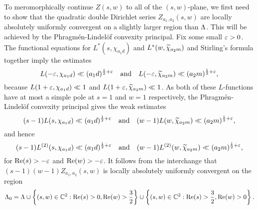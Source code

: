      To meromorphically continue $Z(s,w)$ to all of the $(s,w)$-plane, we first need to show that the quadratic double Dirichlet series $Z_{a_{1},a_{2}}(s,w)$ are locally absolutely uniformly convergent on a slightly larger region than $\Lambda$. This will be achieved by the Phragm\'en-Lindel\"of convexity principal. Fix some small $\varepsilon > 0$. The functional equations for $L^{\ast}(s,\chi_{a_{1}d})$ and $L^{\ast}(w,\widetilde{\chi}_{a_{2}m})$ and Stirling's formula together imply the estimates
    \[
        L(-\varepsilon,\chi_{a_{1}d}) \ll (a_{1}d)^{\frac{1}{2}+\varepsilon} \quad \text{and} \quad L(-\varepsilon,\widetilde{\chi}_{a_{2}m}) \ll (a_{2}m)^{\frac{1}{2}+\varepsilon},
    \]
    because $L(1+\varepsilon,\chi_{a_{1}d}) \ll 1$ and $L(1+\varepsilon,\widetilde{\chi}_{a_{2}m}) \ll 1$. As both of these $L$-functions have at most a simple pole at $s = 1$ and $w = 1$ respectively, the Phragm\'en-Lindel\"of convexity principal gives the weak estimates
    \[
        (s-1)L(s,\chi_{a_{1}d}) \ll (a_{1}d)^{\frac{1}{2}+\varepsilon} \quad \text{and} \quad (w-1)L(w,\widetilde{\chi}_{a_{2}m}) \ll (a_{2}m)^{\frac{1}{2}+\varepsilon},
    \]
    and hence
    \[
        (s-1)L^{(2)}(s,\chi_{a_{1}d}) \ll (a_{1}d)^{\frac{1}{2}+\varepsilon} \quad \text{and} \quad (w-1)L^{(2)}(w,\widetilde{\chi}_{a_{2}m}) \ll (a_{2}m)^{\frac{1}{2}+\varepsilon},
    \]
    for $\mathrm{Re}(s) > -\varepsilon$ and $\mathrm{Re}(w) > -\varepsilon$. It follows from the interchange that $(s-1)(w-1)Z_{a_{1},a_{2}}(s,w)$ is locally absolutely uniformly convergent on the region
    \[
        \Lambda_{0} = \Lambda \cup \left\{(s,w) \in \mathbb{C}^{2}:\mathrm{Re}(s) > 0, \mathrm{Re}(w) > \frac{3}{2}\right\} \cup \left\{(s,w) \in \mathbb{C}^{2}:\mathrm{Re}(s) > \frac{3}{2}, \mathrm{Re}(w) > 0\right\}.
    \]
    
    \begin{center}
    \end{center}
    
